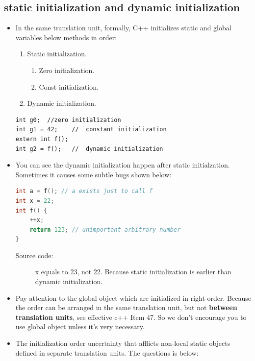 \documentclass[a4paper,11pt,twoside]{book}
\begin{document}
\subsection{static initialization and dynamic initialization}
\begin{itemize}
	\item In the same translation unit, formally, C++ initializes static and global variables below methods in order:
	\begin{enumerate}
		\item Static initialization.
			\begin{enumerate}
			\item Zero initialization.
			\item Const initialization.
			\end{enumerate}
		\item Dynamic initialization.
	\end{enumerate}
		
\begin{lstlisting}[numbers=none]
int g0;  //zero initialization
int g1 = 42;    //  constant initialization
extern int f();
int g2 = f();   //  dynamic initialization
\end{lstlisting}

	\item You can see the dynamic initialization happen after static initialzation. Sometimes it causes some subtle bugs shown below:
\begin{lstlisting}[frame=single, language=c++, mathescape=true]
int a = f(); // a exists just to call f
int x = 22;
int f() {
	++x;
	return 123; // unimportant arbitrary number
}
\end{lstlisting}
\begin{description}
	\item[Source code:] x equals to 23, not 22. Because static initialization is earlier than dynamic initialization.
\end{description}
	
	\item Pay attention to the global object which are initialized in right order. Because the order can be arranged in the same translation unit, but not \textbf{between translation units}, see effective c++ Item 47. So we don't encourage you to use global object unless it's very necessary.
	
	\item The initialization order uncertainty that afflicts non-local static objects defined in separate translation units. The questions is below:
	

\end{itemize}
\end{document}
